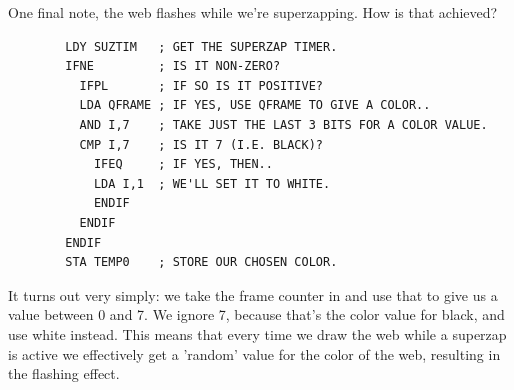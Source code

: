 One final note, the web flashes while we're superzapping. How is that achieved? 

\begin{lstlisting}
        LDY SUZTIM   ; GET THE SUPERZAP TIMER.
        IFNE         ; IS IT NON-ZERO?
          IFPL       ; IF SO IS IT POSITIVE?
          LDA QFRAME ; IF YES, USE QFRAME TO GIVE A COLOR..
          AND I,7    ; TAKE JUST THE LAST 3 BITS FOR A COLOR VALUE.
          CMP I,7    ; IS IT 7 (I.E. BLACK)?
            IFEQ     ; IF YES, THEN..
            LDA I,1  ; WE'LL SET IT TO WHITE.
            ENDIF
          ENDIF
        ENDIF
        STA TEMP0    ; STORE OUR CHOSEN COLOR.
\end{lstlisting}

It turns out very simply: we take
the frame counter in  and use that to give us a value between 0 and 7. We ignore 7, because that's the
color value for black, and use white instead. This means that every time we draw the web while a superzap is active
we effectively get a 'random' value for the color of the web, resulting in the flashing effect.
